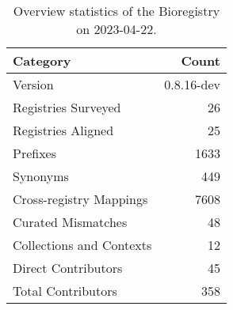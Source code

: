\begin{table}
\caption{Overview statistics of the Bioregistry on 2023-04-22.}
\label{tab:bioregistry-summary}
\begin{tabular}{lr}
\toprule
Category & Count \\
\midrule
Version & 0.8.16-dev \\
Registries Surveyed & 26 \\
Registries Aligned & 25 \\
Prefixes & 1633 \\
Synonyms & 449 \\
Cross-registry Mappings & 7608 \\
Curated Mismatches & 48 \\
Collections and Contexts & 12 \\
Direct Contributors & 45 \\
Total Contributors & 358 \\
\bottomrule
\end{tabular}
\end{table}
